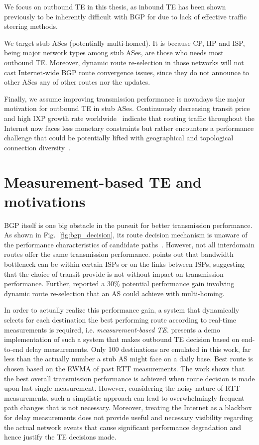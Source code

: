 We focus on outbound TE in this thesis, as inbound TE has been shown previously to be inherently difficult with BGP for due to lack of effective traffic steering methods.

We target stub ASes (potentially multi-homed).
It is because \ac{CP}, \ac{HP} and \ac{ISP}, being major network types among stub ASes, are those who needs most outbound TE.
Moreover, dynamic route re-selection in those networks will not cast Internet-wide BGP route convergence issues, since they do not announce to other ASes any of other routes nor the updates.

Finally, we assume improving transmission performance is nowadays the major motivation for outbound TE in stub ASes.
Continuously decreasing transit price~\cite{transitprice, drpeering} and high \ac{IXP} growth rate worldwide~\cite{pchixp} indicate that routing traffic throughout the Internet now faces less monetary constraints but rather encounters a performance challenge that could be potentially lifted with geographical and topological connection diversity~\cite{Chiu2015}.


\section{Measurement-based TE and motivations}

BGP itself is one big obstacle in the pursuit for better transmission performance.
As shown in Fig.~\ref{fig:bgp_decision}, its route decision mechanism is unaware of the performance characteristics of candidate paths~\cite{Yannuzzi2005}.
However, not all interdomain routes offer the same transmission performance. \citet{Akella2003} points out that bandwidth bottleneck can be within certain \acp{ISP} or on the links between \acp{ISP}, suggesting that the choice of transit provide is not without impact on transmission performance.
Further, \citet{Akella2003a} reported a $30\%$ potential performance gain involving dynamic route re-selection that an AS could achieve with multi-homing.

In order to actually realize this performance gain, a system that dynamically selects for each destination the best performing route according to real-time measurements is required, i.e. \textit{measurement-based TE}.
\citet{Akella2008} presents a demo implementation of such a system that makes outbound TE decision based on end-to-end delay measurements. Only 100 destinations are emulated in this work, far less than the actually number a stub AS might face on a daily base. Best route is chosen based on the \ac{EWMA} of past \ac{RTT} measurements. The work shows that the best overall transmission performance is achieved when route decision is made upon last single measurement. However, considering the noisy nature of \ac{RTT} measurements, such a simplistic approach can lead to overwhelmingly frequent path changes that is not necessary. Moreover, treating the Internet as a blackbox for delay measurements does not provide useful and necessary visibility regarding the actual network events that cause significant performance degradation and hence justify the TE decisions made. 


